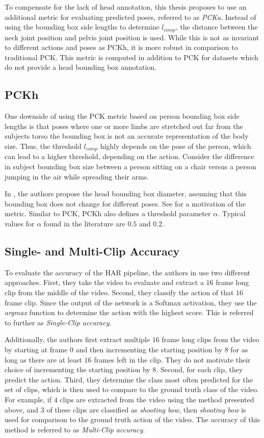 To compensate for the lack of head annotation, this thesis proposes to use an additional metric for evaluating predicted poses, referred to as \textit{PCKu}.
Instead of using the bounding box side lengths to determine $l_{comp}$, the distance between the neck joint position and pelvis joint position is used.
While this is not as invariant to different actions and poses as PCKh, it is more robust in comparison to traditional PCK.
This metric is computed in addition to PCK for datasets which do not provide a head bounding box annotation.

\subsection{PCKh}
\label{sec:exp-pckh}
One downside of using the PCK metric based on person bounding box side lengths is that poses where one or more limbs are stretched out far from the subjects torso the bounding box is not an accurate representation of the body size.
Thus, the threshold $l_{comp}$ highly depends on the pose of the person, which can lead to a higher threshold, depending on the action.
Consider the difference in subject bounding box size between a person sitting on a chair versus a person jumping in the air while spreading their arms.

In \cite{andriluka_2d_2014}, the authors propose the head bounding box diameter, assuming that this bounding box does not change for different poses.
See  for a motivation of the metric.
Similar to PCK, PCKh also defines a threshold parameter $\alpha$.
Typical values for $\alpha$ found in the literature are $0.5$ and $0.2$.

\subsection{Single- and Multi-Clip Accuracy}
To evaluate the accuracy of the HAR pipeline, the authors in \cite{luvizon_2d/3d_2018} use two different approaches.
First, they take the video to evaluate and extract a $16$ frame long clip from the middle of the video.
Second, they classify the action of that $16$ frame clip.
Since the output of the network is a Softmax activation, they use the \textit{argmax} function to determine the action with the highest score.
This is referred to further as \textit{Single-Clip accuracy}.

Additionally, the authors first extract multiple $16$ frame long clips from the video by starting at frame $0$ and then incrementing the starting position by $8$ for as long as there are at least $16$ frames left in the clip.
They do not motivate their choice of incrementing the starting position by $8$.
Second, for each clip, they predict the action.
Third, they determine the class most often predicted for the set of clips, which is then used to compare to the ground truth class of the video.
For example, if $4$ clips are extracted from the video using the method presented above, and $3$ of these clips are classified as \textit{shooting bow}, then \textit{shooting bow} is used for comparison to the ground truth action of the video.
The accuracy of this method is referred to as \textit{Multi-Clip accuracy}.

